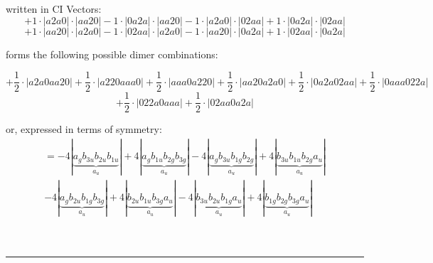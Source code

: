 \documentclass{article}
\begin{document}
\begin{minipage}{\linewidth}
written in CI Vectors: 
 $$+ 1 \cdot \left|a2a0 \right| \cdot \left| aa20 \right| 
- 1 \cdot \left|0a2a \right| \cdot \left| aa20 \right| 
- 1 \cdot \left|a2a0 \right| \cdot \left| 02aa \right| 
+ 1 \cdot \left|0a2a \right| \cdot \left| 02aa \right| 
 $$ $$ + 1 \cdot \left|aa20 \right| \cdot \left| a2a0 \right| 
- 1 \cdot \left|02aa \right| \cdot \left| a2a0 \right| 
- 1 \cdot \left|aa20 \right| \cdot \left| 0a2a \right| 
+ 1 \cdot \left|02aa \right| \cdot \left| 0a2a \right| 
$$



 forms the following possible dimer combinations:

$$+ \frac{1}{2} \cdot \left|a2a0aa20 \right| + \frac{1}{2} \cdot \left|a220aaa0 \right| + \frac{1}{2} \cdot \left|aaa0a220 \right| + \frac{1}{2} \cdot \left|aa20a2a0 \right| + \frac{1}{2} \cdot \left|0a2a02aa \right| + \frac{1}{2} \cdot \left|0aaa022a \right|  $$ $$ + \frac{1}{2} \cdot \left|022a0aaa \right| + \frac{1}{2} \cdot \left|02aa0a2a \right| $$



\end{minipage}
\vspace{0.5cm}


or, expressed in terms of symmetry:\begin{multline*}
=-4\left|\underbrace{a_{g} b_{3u} b_{2u} b_{1u}}_{a_{u}}\right|+4\left|\underbrace{a_{g} b_{1u} b_{2g} b_{3g}}_{a_{u}}\right|-4\left|\underbrace{a_{g} b_{3u} b_{1g} b_{2g}}_{a_{u}}\right|+4\left|\underbrace{b_{3u} b_{1u} b_{2g} a_{u}}_{a_{u}}\right|\\
-4\left|\underbrace{a_{g} b_{2u} b_{1g} b_{3g}}_{a_{u}}\right|+4\left|\underbrace{b_{2u} b_{1u} b_{3g} a_{u}}_{a_{u}}\right|-4\left|\underbrace{b_{3u} b_{2u} b_{1g} a_{u}}_{a_{u}}\right|+4\left|\underbrace{b_{1g} b_{2g} b_{3g} a_{u}}_{a_{u}}\right|
\end{multline*}\\\\

 


\hrule
\vspace{0.5cm}
\end{document}
